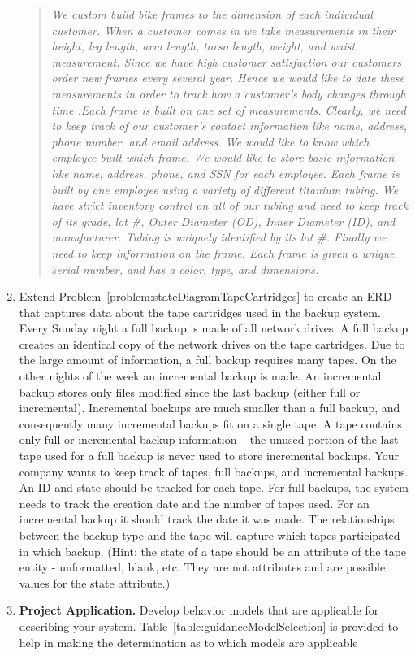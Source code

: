 \begin{enumerate}
\begin{quote}
\emph{We custom build bike frames to the dimension of each individual
customer. When a customer comes in we take measurements in their height,
leg length, arm length, torso length, weight, and waist measurement.
Since we have high customer satisfaction our customers order new frames
every several year. Hence we would like to date these measurements in
order to track how a customer's body changes through time .Each frame is
built on one set of measurements. Clearly, we need to keep track of our
customer's contact information like name, address, phone number, and
email address. We would like to know which employee built which frame.
We would like to store basic information like name, address, phone, and
SSN for each employee. Each frame is built by one employee using a
variety of different titanium tubing. We have strict inventory control
on all of our tubing and need to keep track of its grade, lot \#, Outer
Diameter (OD), Inner Diameter (ID), and manufacturer. Tubing is uniquely
identified by its lot \#. Finally we need to keep information on the
frame. Each frame is given a unique serial number, and has a color,
type, and dimensions.}
\end{quote}


\item
  Extend Problem~\ref{problem:stateDiagramTapeCartridges}
  to create an ERD that captures data about the tape
  cartridges used in the backup system. Every Sunday night a full backup
  is made of all network drives. A full backup creates an identical copy
  of the network drives on the tape cartridges. Due to the large amount
  of information, a full backup requires many tapes. On the other nights
  of the week an incremental backup is made. An incremental backup
  stores only files modified since the last backup (either full or
  incremental). Incremental backups are much smaller than a full backup,
  and consequently many incremental backups fit on a single tape. A tape
  contains only full or incremental backup information -- the unused
  portion of the last tape used for a full backup is never used to store
  incremental backups. Your company wants to keep track of tapes, full
  backups, and incremental backups. An ID and state should be tracked
  for each tape. For full backups, the system needs to track the
  creation date and the number of tapes used. For an incremental backup
  it should track the date it was made. The relationships between the
  backup type and the tape will capture which tapes participated in
  which backup. (Hint: the state of a tape should be an attribute of the
  tape entity - unformatted, blank, etc. They are not attributes and are
  possible values for the state attribute.)

\item
  \textbf{Project Application.} Develop behavior models that are
  applicable for describing your system. 
  Table~\ref{table:guidanceModelSelection} is provided to help
  in making the determination as to which models are applicable
\end{enumerate}
